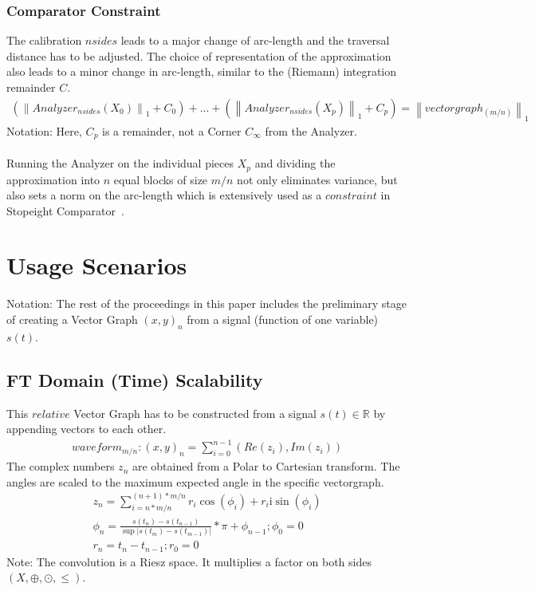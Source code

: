 \documentclass{report}
\newcommand\norm[1]{\left\lVert#1\right\rVert}
\begin{document}
\subsection{Comparator Constraint}
The calibration $nsides$ leads to a major change of arc-length and the traversal distance has to be adjusted. The choice of representation of the approximation also leads to a minor change in arc-length, similar to the (Riemann) integration remainder $C$.
\begin{align}
(\norm{Analyzer_{nsides}(X_{0})}_{1}+C_{0})+...+(\norm{Analyzer_{nsides}(X_{p})}_{1}+C_{p})=\norm{vectorgraph_{(m/n)}}_1
\end{align}
Notation: Here, $C_{p}$ is a remainder, not a Corner $C_{\infty}$ from the Analyzer.\\\\
Running the Analyzer on the individual pieces $X_{p}$ and dividing the approximation into $n$ equal blocks of size $m/n$ not only eliminates variance, but also sets a norm on the arc-length which is extensively used as a $constraint$ in Stopeight Comparator~\cite{Analyzer}.

\chapter{Usage Scenarios}
Notation: The rest of the proceedings in this paper includes the preliminary stage of creating a Vector Graph $(x,y)_{n}$ from a signal (function of one variable) $s(t)$.
\section{FT Domain (Time) Scalability}
This $relative$ Vector Graph has to be constructed from a signal $s(t)\in \mathbb{R}$ by appending vectors to each other.
\begin{align}
waveform_{m/n}: (x,y)_{n}=\sum \limits _{i=0}^{n-1}(Re(z_{i}),Im(z_{i}))
\end{align}
The complex numbers $z_{n}$ are obtained from a Polar to Cartesian transform. The angles are scaled to the maximum expected angle in the specific vectorgraph.
\begin{align}
z_{n}=\sum \limits _{i=n*m/n}^{(n+1)*m/n}r_{i}\cos(\phi_{i})+r_{i}\mathrm{i}\sin(\phi_{i})\\
\phi_{n}=\frac{s(t_{n})-s(t_{n-1})}{\sup \lvert s(t_{m})-s(t_{m-1}) \rvert}*\pi+\phi_{n-1};\phi_{0}=0\\
r_{n}=t_{n}-t_{n-1};r_{0}=0
\end{align}
Note: The convolution is a Riesz space. It multiplies a factor on both sides $(X,\oplus,\odot,\leq)$.
\end{document}
